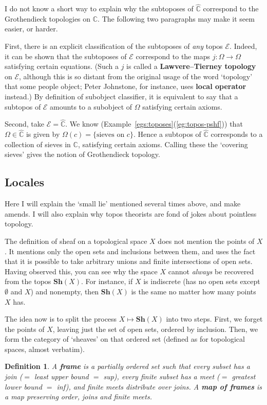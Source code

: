 \documentclass[12pt]{article}
\newcommand{\cat}[1]{\mathscr{#1}}
\newcommand{\fcat}[1]{\mathbf{#1}}
\newcommand{\goesto}{\mapsto}
\newcommand{\demph}[1]{\textbf{\textup{#1}}}
\newcommand{\scat}[1]{\mathbb{#1}}
\newcommand{\chunk}[1]{\subsection*{#1}}
\newcommand{\E}{\cat{E}}
\newcommand{\Psh}[1]{\widehat{#1}}
\newcommand{\Sh}{\fcat{Sh}}
\newcommand{\cln}{\colon}
\newtheorem{predefn}[thm]{Definition}
\newenvironment{defn}{\begin{predefn}\upshape}{\end{predefn}}
\begin{document}
I do not know a short way to explain why the subtoposes of $\Psh{\scat{C}}$
correspond to the Grothendieck topologies on $\scat{C}$.  The following two
paragraphs may make it seem easier, or harder.

First, there is an explicit classification of the subtoposes of \emph{any}
topos $\E$.  Indeed, it can be shown that the subtoposes of $\E$ correspond to
the maps $j\cln \Omega \to \Omega$ satisfying certain equations.  
(Such a $j$ is called a \demph{Lawvere--Tierney topology} on $\E$, although
this is so distant from the original usage of the word `topology' that some
people object; Peter Johnstone, for instance, uses \demph{local operator}
instead.)  By definition of subobject classifier, it is equivalent to say that
a subtopos of $\E$ amounts to a subobject of $\Omega$ satisfying certain
axioms.

Second, take $\E = \Psh{\scat{C}}$.  We know
(Example~\ref{egs:toposes}(\ref{eg:topos-pshf})) that $\Omega \in
\Psh{\scat{C}}$ is given by $\Omega(c) = \{ \text{sieves on } c \}$.  Hence a
subtopos of $\Psh{\scat{C}}$ corresponds to a collection of sieves in
$\scat{C}$, satisfying certain axioms.  Calling these the `covering sieves'
gives the notion of Grothendieck topology.


\chunk{Locales}


Here I will explain the `small lie' mentioned several times above, and make
amends.  I will also explain why topos theorists are fond of jokes about
pointless topology.

The definition of sheaf on a topological space $X$ does not mention the points
of $X$.  It mentions only the open sets and inclusions between them, and uses
the fact that it is possible to take arbitrary unions and finite intersections
of open sets.  Having observed this, you can see why the space $X$ cannot
\emph{always} be recovered from the topos $\Sh(X)$.  For instance, if $X$ is
indiscrete (has no open sets except $\emptyset$ and $X$) and nonempty, then
$\Sh(X)$ is the same no matter how many points $X$ has.

The idea now is to split the process $X \goesto \Sh(X)$ into two steps.  First,
we forget the points of $X$, leaving just the set of open sets, ordered by
inclusion.  Then, we form the category of `sheaves' on that ordered set
(defined as for topological spaces, almost verbatim).

\begin{defn}
A \demph{frame} is a partially ordered set such that every subset has a join
($=$ least upper bound $=$ sup), every finite subset has a meet ($=$ greatest
lower bound $=$ inf), and finite meets distribute over joins.  A \demph{map of
frames} is a map preserving order, joins and finite meets.
\end{defn}
\end{document}
